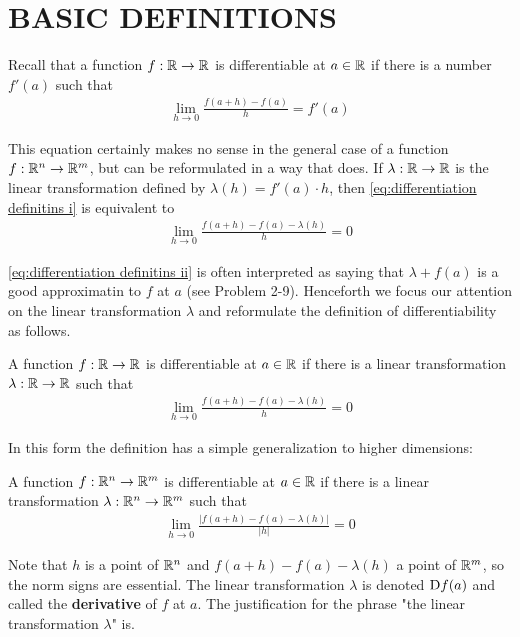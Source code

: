 \section{BASIC DEFINITIONS}
Recall that a function $f:\mathbb{R} \to \mathbb{R}$ is differentiable at $a\in \mathbb{R}$
if there is a number $f'(a)$ such that 
\begin{align}
    \lim_{h\to 0 }{\frac{f(a+h)-f(a)}{h}} = f'(a)
    \label{eq:differentiation definitins i}
\end{align} 

This equation certainly makes no sense in the general case of a
function $f:\mathbb{R}^n \to \mathbb{R}^m$, but can be reformulated in a way that
does. If $\lambda: \mathbb{R} \to \mathbb{R}$ is the linear transformation defined by
$\lambda(h) = f'(a)\cdot h$, then \eqref{eq:differentiation definitins i} 
is equivalent to 
\begin{align}
    \lim_{h\to 0 }{\frac{f(a+h)-f(a)-\lambda(h)}{h}} = 0
    \label{eq:differentiation definitins ii}
\end{align} 

\eqref{eq:differentiation definitins ii} is often interpreted as saying that 
$\lambda + f(a)$ is a good approximatin to $f$ at $a$ (see Problem 2-9).
Henceforth we focus our attention on the linear transformation $\lambda$ and
reformulate the definition of differentiability as follows.

A function $f:\mathbb{R} \to \mathbb{R}$ is differentiable at $a\in \mathbb{R}$
if there is a linear transformation $\lambda:\mathbb{R}\to \mathbb{R}$ such that 
\begin{align}
    \lim_{h\to 0 }{\frac{f(a+h)-f(a)-\lambda(h)}{h}} = 0
    \label{eq:differentiation definitins iii}
\end{align} 

In this form the definition has a simple generalization to
higher dimensions:

A function $f:\mathbb{R}^n \to \mathbb{R}^m$ is differentiable at $a\in \mathbb{R}$
if there is a linear transformation $\lambda:\mathbb{R}^n\to \mathbb{R}^m$ such that
\begin{align}
    \lim_{h\to 0 }{\frac{|f(a+h)-f(a)-\lambda(h)|}{|h|}} = 0
    \label{eq:differentiation definitins iiii}
\end{align} 

Note that $h$ is a point of $\mathbb{R}^n$ and $f(a+h)-f(a)-\lambda(h)$ a
point of $\mathbb{R}^m$, so the norm signs are essential. The linear 
transformation $\lambda$ is denoted $\mathrm{D}f(a)$ and called the \textbf{derivative} of 
$f$ at $a$. The justification for the phrase "the linear transformation $\lambda$" is.

